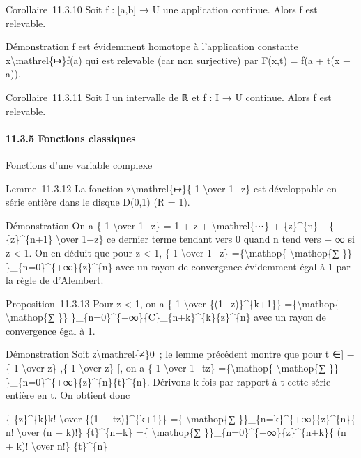 \documentclass[]{article}
\begin{document}
Corollaire~11.3.10 Soit f : {[}a,b{]} → U une application continue.
Alors f est relevable.

Démonstration f est évidemment homotope à l'application constante
x\textbackslash{}mathrel\{↦\}f(a) qui est relevable (car non surjective)
par F(x,t) = f(a + t(x − a)).

Corollaire~11.3.11 Soit I un intervalle de ℝ et f : I → U continue.
Alors f est relevable.

\paragraph{11.3.5 Fonctions classiques}

Fonctions d'une variable complexe

Lemme~11.3.12 La fonction z\textbackslash{}mathrel\{↦\}\{ 1
\textbackslash{}over 1−z\} est développable en série entière dans le
disque D(0,1) (R = 1).

Démonstration On a \{ 1 \textbackslash{}over 1−z\} = 1 + z +
\textbackslash{}mathrel\{⋯\} + \{z\}\^{}\{n\} +\{ \{z\}\^{}\{n+1\}
\textbackslash{}over 1−z\} ce dernier terme tendant vers 0 quand n tend
vers + ∞ si \textbar{}z\textbar{} \textless{} 1. On en déduit que pour
\textbar{}z\textbar{} \textless{} 1, \{ 1 \textbackslash{}over 1−z\}
=\{\textbackslash{}mathop\{ \textbackslash{}mathop\{∑ \}\}
\}\_\{n=0\}\^{}\{+∞\}\{z\}\^{}\{n\} avec un rayon de convergence
évidemment égal à 1 par la règle de d'Alembert.

Proposition~11.3.13 Pour \textbar{}z\textbar{} \textless{} 1, on a \{ 1
\textbackslash{}over \{(1−z)\}\^{}\{k+1\}\} =\{\textbackslash{}mathop\{
\textbackslash{}mathop\{∑ \}\}
\}\_\{n=0\}\^{}\{+∞\}\{C\}\_\{n+k\}\^{}\{k\}\{z\}\^{}\{n\} avec un rayon
de convergence égal à 1.

Démonstration Soit z\textbackslash{}mathrel\{≠\}0~; le lemme précédent
montre que pour t ∈{]} −\{ 1 \textbackslash{}over
\textbar{}z\textbar{}\} ,\{ 1 \textbackslash{}over
\textbar{}z\textbar{}\} {[}, on a \{ 1 \textbackslash{}over 1−tz\}
=\{\textbackslash{}mathop\{ \textbackslash{}mathop\{∑ \}\}
\}\_\{n=0\}\^{}\{+∞\}\{z\}\^{}\{n\}\{t\}\^{}\{n\}. Dérivons k fois par
rapport à t cette série entière en t. On obtient donc

\{ \{z\}\^{}\{k\}k! \textbackslash{}over \{(1 − tz)\}\^{}\{k+1\}\} =\{
\textbackslash{}mathop\{∑ \}\}\_\{n=k\}\^{}\{+∞\}\{z\}\^{}\{n\}\{ n!
\textbackslash{}over (n − k)!\} \{t\}\^{}\{n−k\} =\{
\textbackslash{}mathop\{∑ \}\}\_\{n=0\}\^{}\{+∞\}\{z\}\^{}\{n+k\}\{ (n +
k)! \textbackslash{}over n!\} \{t\}\^{}\{n\}
\end{document}
